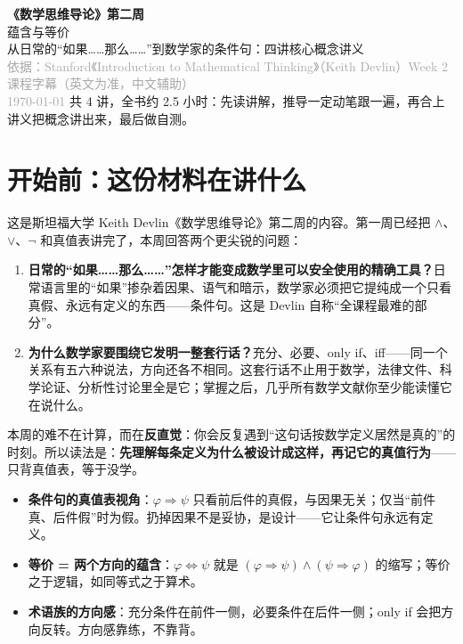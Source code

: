 \documentclass[UTF8,a4paper,11pt]{ctexart}
\begin{document}
\begin{center}
  \vspace*{2cm}
  {\Huge\bfseries\color{accent} 《数学思维导论》第二周}\\[0.4cm]
  {\LARGE 蕴含与等价}\\[1.2cm]
  {\large 从日常的“如果……那么……”到数学家的条件句：四讲核心概念讲义}\\[0.5cm]
  {\small\textcolor{darkgray}{依据：Stanford《Introduction to Mathematical Thinking》（Keith Devlin）Week 2 课程字幕（英文为准，中文辅助）}}\\[0.3cm]
  {\small\textcolor{darkgray}{\today}}
  \vfill
  {\small 共 4 讲，全书约 2.5 小时：先读讲解，推导一定动笔跟一遍，再合上讲义把概念讲出来，最后做自测。}
\end{center}
\newpage

\tableofcontents
\newpage

\section*{开始前：这份材料在讲什么}

这是斯坦福大学 Keith Devlin《数学思维导论》第二周的内容。第一周已经把 $\land$、$\lor$、$\neg$ 和真值表讲完了，本周回答两个更尖锐的问题：

\begin{enumerate}
  \item \textbf{日常的“如果……那么……”怎样才能变成数学里可以安全使用的精确工具？}日常语言里的“如果”掺杂着因果、语气和暗示，数学家必须把它提纯成一个只看真假、永远有定义的东西——条件句。这是 Devlin 自称“全课程最难的部分”。
  \item \textbf{为什么数学家要围绕它发明一整套行话？}充分、必要、only if、iff——同一个关系有五六种说法，方向还各不相同。这套行话不止用于数学，法律文件、科学论证、分析性讨论里全是它；掌握之后，几乎所有数学文献你至少能读懂它在说什么。
\end{enumerate}

本周的难不在计算，而在\textbf{反直觉}：你会反复遇到“这句话按数学定义居然是真的”的时刻。所以读法是：\textbf{先理解每条定义为什么被设计成这样，再记它的真值行为}——只背真值表，等于没学。

\begin{keyconcept}[四讲要带走的三样工具]
\begin{itemize}
  \item \textbf{条件句的真值表视角}：$\varphi \Rightarrow \psi$ 只看前后件的真假，与因果无关；仅当“前件真、后件假”时为假。扔掉因果不是妥协，是设计——它让条件句永远有定义。
  \item \textbf{等价 = 两个方向的蕴含}：$\varphi \Leftrightarrow \psi$ 就是 $(\varphi \Rightarrow \psi) \land (\psi \Rightarrow \varphi)$ 的缩写；等价之于逻辑，如同等式之于算术。
  \item \textbf{术语族的方向感}：充分条件在前件一侧，必要条件在后件一侧；only if 会把方向反转。方向感靠练，不靠背。
\end{itemize}
\end{keyconcept}
\end{document}
